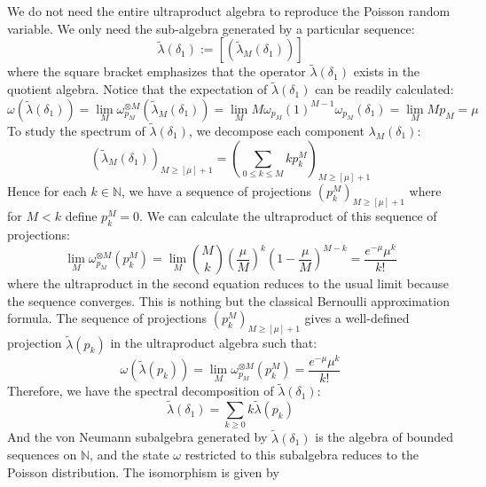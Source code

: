 \documentclass[a4paper,11pt]{article}
\theoremstyle{definition}
\numberwithin{equation}{section}
\begin{document}
We do not need the entire ultraproduct algebra to reproduce the Poisson random variable. We only need the sub-algebra generated by a particular sequence: 
\begin{equation}
    \widetilde{\lambda}(\delta_1) := [(\widetilde{\lambda}_M(\delta_1))]
\end{equation}
where the square bracket emphasizes that the operator $\widetilde{\lambda}(\delta_1)$ exists in the quotient algebra. Notice that the expectation of $\widetilde{\lambda}(\delta_1)$ can be readily calculated:
\begin{equation}
    \omega(\widetilde{\lambda}(\delta_1)) = \lim_{M}\omega_{p_M}^{\otimes M}(\widetilde{\lambda}_M(\delta_1)) = \lim_M M\omega_{p_M}(1)^{M-1}\omega_{p_M}(\delta_1) = \lim_M Mp_M = \mu
\end{equation}
To study the spectrum of $\widetilde{\lambda}(\delta_1)$, we decompose each component $\lambda_M(\delta_1)$:
\begin{equation}
    (\widetilde{\lambda}_M(\delta_1))_{M\geq [\mu]+1} = (\sum_{0\leq k\leq M}kp^M_k)_{M\geq [\mu]+1} 
\end{equation}
Hence for each $k\in\mathbb{N}$, we have a sequence of projections $(p^M_k)_{M\geq [\mu]+1}$ where for $M < k$ define $p^M_k = 0$. We can calculate the ultraproduct of this sequence of projections:
\begin{equation}
    \lim_{M}\omega_{p_M}^{\otimes M}(p^M_k) = \lim_{M}\binom{M}{k}(\frac{\mu}{M})^k(1 - \frac{\mu}{M})^{M-k} = \frac{e^{-\mu}\mu^k}{k!}
\end{equation}
where the ultraproduct in the second equation reduces to the usual limit because the sequence converges. This is nothing but the classical Bernoulli approximation formula. The sequence of projections $(p^M_k)_{M\geq[\mu]+1}$ gives a well-defined projection $\widetilde{\lambda}(p_k)$ in the ultraproduct algebra such that:
\begin{equation}
    \omega(\widetilde{\lambda}(p_k)) = \lim_{M}\omega_{p_M}^{\otimes M}(p_k^M) = \frac{e^{-\mu}\mu^k}{k!}
\end{equation}
Therefore, we have the spectral decomposition of $\widetilde{\lambda}(\delta_1)$:
\begin{equation}
    \widetilde{\lambda}(\delta_1) = \sum_{k\geq 0}k\widetilde{\lambda}(p_k)
\end{equation}
And the von Neumann subalgebra generated by $\widetilde{\lambda}(\delta_1)$ is the algebra of bounded sequences on $\mathbb{N}$, and the state $\omega$ restricted to this subalgebra reduces to the Poisson distribution. The isomorphism is given by
\end{document}

